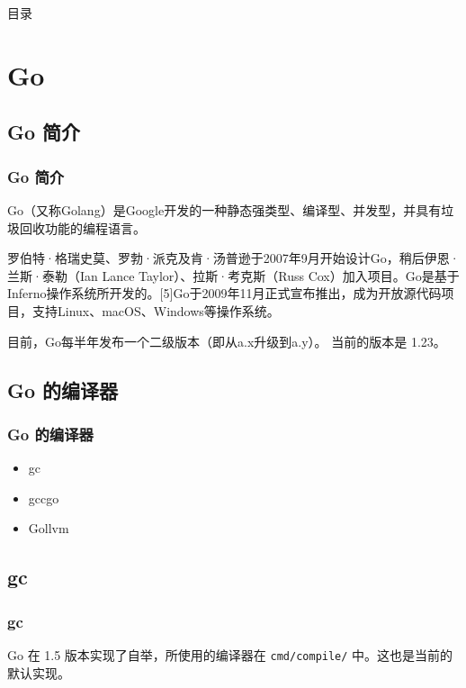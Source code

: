 \documentclass[xcolor=table,dvipsnames,svgnames,aspectratio=169]{ctexbeamer}
\begin{document}

\begin{frame}{目录}
  \tableofcontents[hideallsubsections]	%
\end{frame}

\section{Go}

\subsection{Go 简介}

\begin{frame}
  \frametitle{Go 简介}

  Go（又称Golang）是Google开发的一种静态强类型、编译型、并发型，并具有垃圾回收功能的编程语言。

  罗伯特·格瑞史莫、罗勃·派克及肯·汤普逊于2007年9月开始设计Go，稍后伊恩·兰斯·泰勒（Ian Lance Taylor）、拉斯·考克斯（Russ Cox）加入项目。Go是基于Inferno操作系统所开发的。[5]Go于2009年11月正式宣布推出，成为开放源代码项目，支持Linux、macOS、Windows等操作系统。

目前，Go每半年发布一个二级版本（即从a.x升级到a.y）。 当前的版本是 1.23。

\end{frame}

\subsection{Go 的编译器}

\begin{frame}
  \frametitle{Go 的编译器}
  \begin{itemize}
    \item gc
    \item gccgo
    \item Gollvm
  \end{itemize}

\end{frame}

\subsection{gc}

\begin{frame}
  \frametitle{gc}

  Go 在 1.5 版本实现了自举，所使用的编译器在 \lstinline|cmd/compile/| 中。这也是当前的默认实现。
\end{frame}
\end{document}
